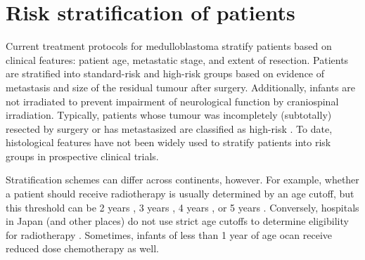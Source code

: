 %
%
%
%


\section{Risk stratification of patients}

Current treatment protocols for medulloblastoma stratify patients based on clinical features: patient age, metastatic stage, and extent of resection. Patients are stratified into standard-risk and high-risk groups based on evidence of metastasis and size of the residual tumour after surgery. Additionally, infants are not irradiated to prevent impairment of neurological function by craniospinal irradiation. Typically, patients whose tumour was incompletely (subtotally) resected by surgery or has metastasized are classified as high-risk . To date, histological features have not been widely used to stratify patients into risk groups in prospective clinical trials.

Stratification schemes can differ across continents, however. For example, whether a patient should receive radiotherapy is usually determined by an age cutoff, but this threshold can be 2 years , 3 years , 4 years , or 5 years . Conversely, hospitals in Japan (and other places) do not use strict age cutoffs to determine eligibility for radiotherapy  . Sometimes, infants of less than 1 year of age ocan receive reduced dose chemotherapy as well.


